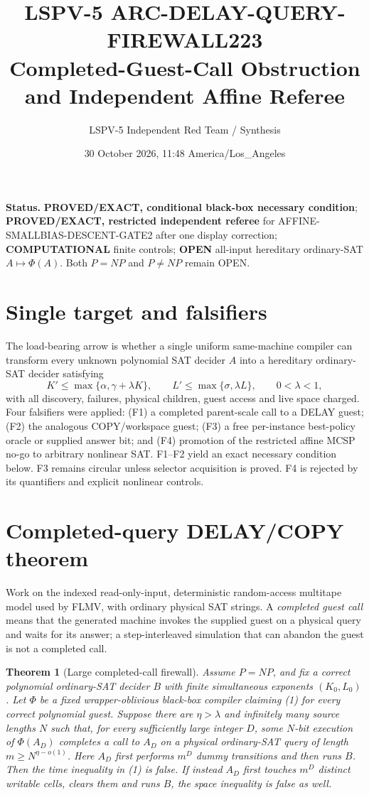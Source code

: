 \documentclass[11pt]{article}
\title{LSPV-5 ARC-DELAY-QUERY-FIREWALL223\\
Completed-Guest-Call Obstruction and Independent Affine Referee}
\author{LSPV-5 Independent Red Team / Synthesis}
\date{30 October 2026, 11:48 America/Los\_Angeles}
\newtheorem{theorem}{Theorem}
\begin{document}
\maketitle

\noindent\textbf{Status.} \textbf{PROVED/EXACT, conditional black-box necessary
condition}; \textbf{PROVED/EXACT, restricted independent referee} for
AFFINE-SMALLBIAS-DESCENT-GATE2 after one display correction;
\textbf{COMPUTATIONAL} finite controls; \textbf{OPEN} all-input hereditary
ordinary-SAT $A\mapsto\Phi(A)$.  Both $P=NP$ and $P\ne NP$ remain OPEN.

\section{Single target and falsifiers}
The load-bearing arrow is whether a single uniform same-machine compiler can
transform every unknown polynomial SAT decider $A$ into a hereditary ordinary-SAT
decider satisfying
\[
 K'\le\max\{\alpha,\gamma+\lambda K\},\qquad
 L'\le\max\{\sigma,\lambda L\},\qquad 0<\lambda<1,                 \tag{1}
\]
with all discovery, failures, physical children, guest access and live space
charged.  Four falsifiers were applied: (F1) a completed parent-scale call to a
DELAY guest; (F2) the analogous COPY/workspace guest; (F3) a free per-instance
best-policy oracle or supplied answer bit; and (F4) promotion of the restricted
affine MCSP no-go to arbitrary nonlinear SAT.  F1--F2 yield an exact necessary
condition below.  F3 remains circular unless selector acquisition is proved.
F4 is rejected by its quantifiers and explicit nonlinear controls.

\section{Completed-query DELAY/COPY theorem}
Work on the indexed read-only-input, deterministic random-access multitape model
used by FLMV, with ordinary physical SAT strings.  A \emph{completed guest call}
means that the generated machine invokes the supplied guest on a physical query
and waits for its answer; a step-interleaved simulation that can abandon the
guest is not a completed call.

\begin{theorem}[Large completed-call firewall]
Assume $P=NP$, and fix a correct polynomial ordinary-SAT decider $B$ with finite
simultaneous exponents $(K_0,L_0)$.  Let $\Phi$ be a fixed wrapper-oblivious
black-box compiler claiming (1) for every correct polynomial guest.  Suppose
there are $\eta>\lambda$ and infinitely many source lengths $N$ such that, for
every sufficiently large integer $D$, some $N$-bit execution of $\Phi(A_D)$
completes a call to $A_D$ on a physical ordinary-SAT query of length
$m\ge N^{\eta-o(1)}$.  Here $A_D$ first performs $m^D$ dummy transitions and
then runs $B$.  Then the time inequality in (1) is false.  If instead $A_D$
first touches $m^D$ distinct writable cells, clears them and runs $B$, the space
inequality is false as well.
\end{theorem}
\end{document}
